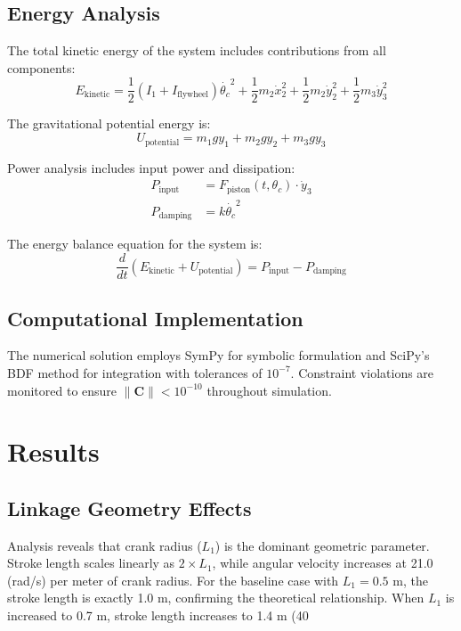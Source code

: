 \documentclass[10pt]{article}
\begin{document}
\subsection{Energy Analysis}

The total kinetic energy of the system includes contributions from all components:
\begin{equation}
    E_{\text{kinetic}} = \frac{1}{2} (I_1 + I_{\text{flywheel}}) \dot{\theta_c}^2 + \frac{1}{2} m_2 \dot{x}_2^2 + \frac{1}{2} m_2 \dot{y}_2^2 + \frac{1}{2} m_3 \dot{y}_3^2
\end{equation}

The gravitational potential energy is:
\begin{equation}
    U_{\text{potential}} = m_1 g y_1 + m_2 g y_2 + m_3 g y_3
\end{equation}

Power analysis includes input power and dissipation:
\begin{align}
    P_{\text{input}} &= F_{\text{piston}}(t, \theta_c) \cdot \dot{y}_3 \\
    P_{\text{damping}} &= k \dot{\theta_c}^2
\end{align}

The energy balance equation for the system is:
\begin{equation}
    \frac{d}{dt}(E_{\text{kinetic}} + U_{\text{potential}}) = P_{\text{input}} - P_{\text{damping}}
\end{equation}

\subsection{Computational Implementation}

The numerical solution employs SymPy for symbolic formulation and SciPy's BDF method for integration with tolerances of $10^{-7}$. Constraint violations are monitored to ensure $\|\mathbf{C}\| < 10^{-10}$ throughout simulation.

\section{Results}

\subsection{Linkage Geometry Effects}

Analysis reveals that crank radius ($L_1$) is the dominant geometric parameter. Stroke length scales linearly as $2 \times L_1$, while angular velocity increases at 21.0 (rad/s) per meter of crank radius. For the baseline case with $L_1 = 0.5$ m, the stroke length is exactly 1.0 m, confirming the theoretical relationship. When $L_1$ is increased to 0.7 m, stroke length increases to 1.4 m (40%
\end{document}

